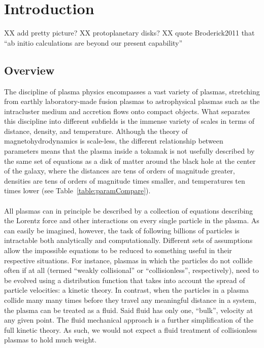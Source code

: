 \chapter{Introduction}
XX add pretty picture?
XX protoplanetary disks?
XX quote Broderick2011 that ``ab initio calculations are beyond our present capability''

\section{Overview}
The discipline of plasma physics encompasses a vast variety of plasmas, stretching from earthly laboratory-made fusion plasmas to astrophysical plasmas such as the intracluster medium and accretion flows onto compact objects. What separates this discipline into different subfields is the immense variety of scales in terms of distance, density, and temperature. Although the theory of magnetohydrodynamics is scale-less, the different relationship between parameters means that the plasma inside a tokamak is not usefully described by the same set of equations as a disk of matter around the black hole at the center of the galaxy, where the distances are tens of orders of magnitude greater, densities are tens of orders of magnitude times smaller, and temperatures ten times lower (see Table~\ref{table:paramCompare}).\\
\\
All plasmas can in principle be described by a collection of equations describing the Lorentz force and other interactions on every single particle in the plasma. As can easily be imagined, however, the task of following billions of particles is intractable both analytically and computationally. Different sets of assumptions allow the impossible equations to be reduced to something useful in their respective situations. For instance, plasmas in which the particles do not collide often if at all (termed ``weakly collisional'' or ``collisionless'', respectively), need to be evolved using a distribution function that takes into account the spread of particle velocities: a kinetic theory. In contrast, when the particles in a plasma collide many many times before they travel any meaningful distance in a system, the plasma can be treated as a fluid. Said fluid has only one, ``bulk'', velocity at any given point. The fluid mechanical approach is a further simplification of the full kinetic theory. As such, we would not expect a fluid treatment of collisionless plasmas to hold much weight.\\
\\
